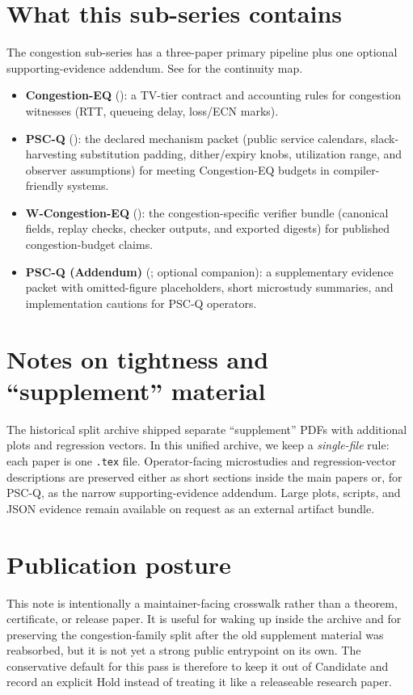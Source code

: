 \documentclass[11pt]{article}
\begin{document}
\section*{What this sub-series contains}
The congestion sub-series has a three-paper primary pipeline plus one optional supporting-evidence addendum. See  for the continuity map.
\begin{itemize}[leftmargin=1.2em]
\item \textbf{Congestion-EQ} (): a TV-tier contract and accounting rules for congestion witnesses (RTT, queueing delay, loss/ECN marks).
\item \textbf{PSC-Q} (): the declared mechanism packet (public service calendars, slack-harvesting substitution padding, dither/expiry knobs, utilization range, and observer assumptions) for meeting Congestion-EQ budgets in compiler-friendly systems.
\item \textbf{W-Congestion-EQ} (): the congestion-specific verifier bundle (canonical fields, replay checks, checker outputs, and exported digests) for published congestion-budget claims.
\item \textbf{PSC-Q (Addendum)} (; optional companion): a supplementary evidence packet with omitted-figure placeholders, short microstudy summaries, and implementation cautions for PSC-Q operators.
\end{itemize}

\section*{Notes on tightness and ``supplement'' material}
The historical split archive shipped separate ``supplement'' PDFs with additional plots and regression vectors.
In this unified archive, we keep a \emph{single-file} rule: each paper is one \texttt{.tex} file.
Operator-facing microstudies and regression-vector descriptions are preserved either as short sections inside the main papers or, for PSC-Q, as the narrow supporting-evidence addendum. Large plots, scripts, and JSON evidence remain available on request as an external artifact bundle.

\section*{Publication posture}
This note is intentionally a maintainer-facing crosswalk rather than a theorem, certificate, or release paper. It is useful for waking up inside the archive and for preserving the congestion-family split after the old supplement material was reabsorbed, but it is not yet a strong public entrypoint on its own. The conservative default for this pass is therefore to keep it out of Candidate and record an explicit Hold instead of treating it like a releaseable research paper.
\end{document}
